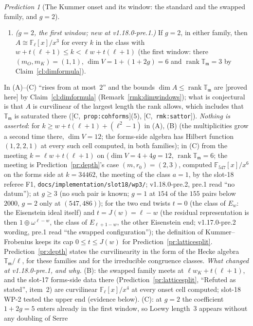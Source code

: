 \documentclass[11pt]{article}
\theoremstyle{remark}
\newtheorem{prediction}[theorem]{Prediction}
\newcommand{\F}{\mathbb{F}}
\newcommand{\Fl}{\F_\ell}
\DeclareMathOperator{\rank}{rank}
\newcommand{\T}{\mathbb{T}}
\newcommand{\m}{\mathfrak{m}}
\newcommand{\HA}[1]{[C,~\texttt{#1}]}      %
\newcommand{\PROVED}{\textsf{[proved here]}}
\begin{document}
\begin{prediction}[The Kummer onset and its window: the standard and the swapped family, and $g=2$]
\begin{enumerate}
{  meeting}; at the same twist~$t$ it is the cheaper of the two meetings of a pair exactly when $w_K<w_O$, e.g.\ at $103$ and $691$; v1.18.0-pre.2, the referee F1's
m-E7: pre.1 omitted ``at the same twist'').
\item[(C)] \emph{($g=2$, the first window; new at v1.18.0-pre.1.)} If $g=2$, in either family, then $A\cong\Fl[x]/x^3$ for every $k$ in the class with
  $w+t(\ell+1)\le k<\ell w+t(\ell+1)$ (the first window: there $(m_O,m_K)=(1,1)$, $\dim V=1+(1+2g)=6$ and $\rank\T_\m=3$ by Claim~\ref{cl:dimformula}).
\end{enumerate}
In (A)--(C) ``rises from at most~$2$'' and the bounds $\dim A\le\rank\T_\m$ are \PROVED{} by Claim~\ref{cl:dimformula} (Remark~\ref{rmk:dimwindows}); what is
conjectural is that $A$ is curvilinear of the largest length the rank allows, which includes that $\T_\m$ is saturated there (\HA{prop:cohforms}(5),
\HA{rmk:sattor}). \emph{Nothing is asserted}: for $k\ge w+t(\ell+1)+(\ell^{2}-1)$ in (A), (B) (the multiplicities grow a second time there, $\dim V=12$; the
forms-side algebra has Hilbert function $(1,2,2,1)$ at every such cell computed, in both families); in (C) from the meeting $k=\ell w+t(\ell+1)$ on
($\dim V=4+4g=12$, $\rank\T_\m=6$; the meeting is Prediction~\ref{pr:depth}'s case $(m,r_0)=(2,3)$, computed $\F_{547}[x]/x^6$ on the forms side at
$k=34462$, the meeting of the class $a=1$, by the slot-18 referee F1, \texttt{docs/implementation/slot18/wp3/}; v1.18.0-pre.2, pre.1 read ``no datum''); at $g\ge3$ (no such pair is known; $g=1$ at $154$ of the $155$
pairs below $2000$, $g=2$ only at $(547,486)$); for the two end twists $t=0$ (the class of $E_w$: the Eisenstein ideal itself) and $t=J(w)=\ell-w$ (the
residual representation is then $1\oplus\omega^{\ell-w}$, the class of $E_{\ell+1-w}$, the other Eisenstein end; v1.17.0-pre.2 wording, pre.1 read ``the swapped
configuration''); the definition of Kummer--Frobenius keeps its cap $0\le t\le J(w)$ for Prediction~\ref{pr:latticesplit}. Prediction~\ref{pr:depth} states
the curvilinearity in the form of the Hecke algebra $\T_\m/\ell$, for these families and for the irreducible congruence classes.
\emph{What changed at v1.18.0-pre.1, and why.} (B): the swapped family meets at $\ell w_K+t(\ell+1)$, and the slot-17 forms-side data there
(Prediction~\ref{pr:latticesplit}, ``Refuted as stated'', item~2) are curvilinear $\Fl[x]/x^4$ at every onset cell computed; slot-18 WP-2 tested the upper end
(evidence below). (C): at $g=2$ the coefficient $1+2g=5$ enters already in the first window, so Loewy length~$3$ appears without any doubling of Serre

\end{prediction}
\end{document}
